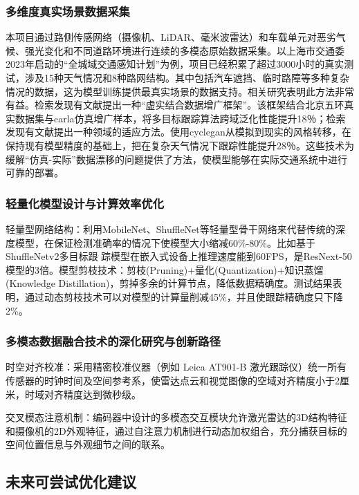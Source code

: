 \subsubsection{多维度真实场景数据采集}


本项目通过路侧传感网络（摄像机、LiDAR、毫米波雷达）和车载单元对恶劣气候、强光变化和不同道路环境进行连续的多模态原始数据采集。以上海市交通委2023年启动的“全城域交通感知计划”为例，项目已经积累了超过3000小时的真实测试，涉及15种天气情况和8种路网结构。其中包括汽车遮挡、临时路障等多种复杂情况的数据，这为模型训练提供最真实场景的数据支持。相关研究表明此方法非常有益。检索发现有文献提出一种“虚实结合数据增广框架”。该框架结合北京五环真实数据集与carla仿真增广样本，将多目标跟踪算法跨域泛化性能提升18％；检索发现有文献提出一种领域的适应方法。使用cyclegan从模拟到现实的风格转移，在保持现有模型精度的基础上，把在复杂天气情况下跟踪性能提升28％。这些技术为缓解“仿真-实际”数据漂移的问题提供了方法，使模型能够在实际交通系统中进行可靠的部署。


\subsubsection{轻量化模型设计与计算效率优化}


轻量型网络结构：利用MobileNet、ShuffleNet等轻量型骨干网络来代替传统的深度模型，在保证检测准确率的情况下使模型大小缩减60\%-80\%。比如基于ShuffleNetv2多目标跟  踪模型在嵌入式设备上推理速度能到60FPS，是ResNext-50模型的3倍。模型剪枝技术：剪枝(Pruning)+量化(Quantization)+知识蒸馏(Knowledge Distillation)，剪掉多余的计算节点，降低数据精确度。测试结果表明，通过动态剪枝技术可以对模型的计算量削减45\%，并且使跟踪精确度只下降2\%。


\subsubsection{多模态数据融合技术的深化研究与创新路径}

时空对齐校准：采用精密校准仪器（例如 Leica AT901-B 激光跟踪仪）统一所有传感器的时钟时间及空间参考系，使雷达点云和视觉图像的空域对齐精度小于2厘米，时域对齐精度达到微秒级。

交叉模态注意机制：编码器中设计的多模态交互模块允许激光雷达的3D结构特征和摄像机的2D外观特征，通过自注意力机制进行动态加权组合，充分捕获目标的空间位置信息与外观细节之间的联系。

\subsection{未来可尝试优化建议}

